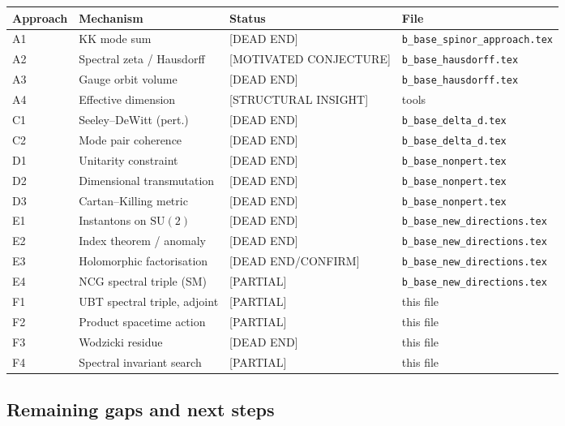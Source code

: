 \documentclass[11pt,a4paper]{article}
\theoremstyle{definition}
\theoremstyle{remark}
\begin{document}
\begin{center}
\begin{tabular}{llll}
  \toprule
  Approach & Mechanism & Status & File \\
  \midrule
  A1 & KK mode sum & [DEAD END] & \texttt{b\_base\_spinor\_approach.tex} \\
  A2 & Spectral zeta / Hausdorff & [MOTIVATED CONJECTURE] & \texttt{b\_base\_hausdorff.tex} \\
  A3 & Gauge orbit volume & [DEAD END] & \texttt{b\_base\_hausdorff.tex} \\
  A4 & Effective dimension & [STRUCTURAL INSIGHT] & tools \\
  C1 & Seeley--DeWitt (pert.) & [DEAD END] & \texttt{b\_base\_delta\_d.tex} \\
  C2 & Mode pair coherence & [DEAD END] & \texttt{b\_base\_delta\_d.tex} \\
  D1 & Unitarity constraint & [DEAD END] & \texttt{b\_base\_nonpert.tex} \\
  D2 & Dimensional transmutation & [DEAD END] & \texttt{b\_base\_nonpert.tex} \\
  D3 & Cartan--Killing metric & [DEAD END] & \texttt{b\_base\_nonpert.tex} \\
  E1 & Instantons on $\mathrm{SU}(2)$ & [DEAD END] & \texttt{b\_base\_new\_directions.tex} \\
  E2 & Index theorem / anomaly & [DEAD END] & \texttt{b\_base\_new\_directions.tex} \\
  E3 & Holomorphic factorisation & [DEAD END/CONFIRM] & \texttt{b\_base\_new\_directions.tex} \\
  E4 & NCG spectral triple (SM) & [PARTIAL] & \texttt{b\_base\_new\_directions.tex} \\
  F1 & UBT spectral triple, adjoint & [PARTIAL] & this file \\
  F2 & Product spacetime action & [PARTIAL] & this file \\
  F3 & Wodzicki residue & [DEAD END] & this file \\
  F4 & Spectral invariant search & [PARTIAL] & this file \\
  \bottomrule
\end{tabular}
\end{center}

\subsection{Remaining gaps and next steps}
\end{document}
